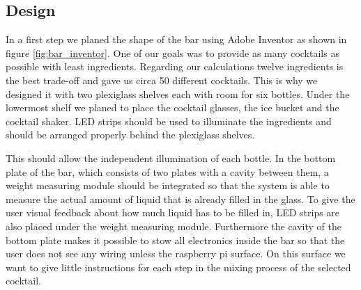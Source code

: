 \documentclass{acm_proc_article-sp}
\begin{document}
\subsection{Design}

In a first step we planed the shape of the bar using Adobe Inventor as shown in figure \ref{fig:bar_inventor}. One of our goals was to provide as many cocktails as possible with least ingredients. Regarding our calculations twelve ingredients is the best trade-off and gave us circa 50 different cocktails. This is why we designed it with two plexiglass shelves each with room for six bottles. Under the lowermost shelf we planed to place the cocktail glasses, the ice bucket and the cocktail shaker. LED strips should be used to illuminate the ingredients and should be arranged properly behind the plexiglass shelves. 

\begin{minipage}{\linewidth}%
\label{fig:bar_inventor}%
\end{minipage}

This should allow the independent illumination of each bottle. In the bottom plate of the bar, which consists of two plates with a cavity between them, a weight measuring module should be integrated so that the system is able to measure the actual amount of liquid that is already filled in the glass. To give the user visual feedback about how much liquid has to be filled in, LED strips are also placed under the weight measuring module. Furthermore the cavity of the bottom plate makes it possible to stow all electronics inside the bar so that the user does not see any wiring unless the raspberry pi surface. On this surface we want to give little instructions for each step in the mixing process of the selected cocktail.
\end{document}
